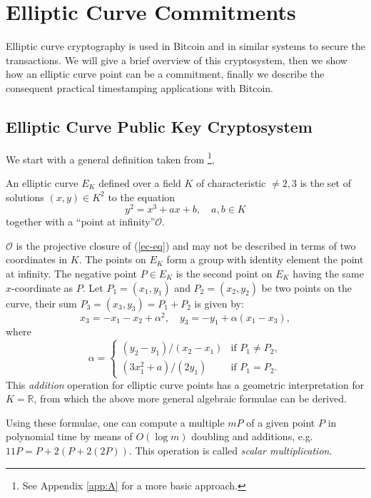 \chapter{Elliptic Curve Commitments}
\label{chpr:ec-commitments}
Elliptic curve cryptography is used in Bitcoin and in similar systems to secure the transactions. 
We will give a brief overview of this cryptosystem, then we show how an elliptic curve point can be a commitment, finally we describe the consequent practical timestamping applications with Bitcoin.  

\section{Elliptic Curve Public Key Cryptosystem}
We start with a general definition taken from \cite{Koblitz1987}\footnote{See Appendix \ref{app:A} for a more basic approach.},
\begin{mydef}
	An elliptic curve $E_K$ defined over a field $K$ of characteristic $\neq 2, 3$ is the set of solutions $(x,y)\in K^2$ to the equation
	\begin{equation}
	\label{ec-eq}
	y^2 = x^3 + ax + b, \quad a,b \in K
	\end{equation}
	together with a \textquotedblleft point at infinity\textquotedblright $\mathcal{O}$.
\end{mydef}
$\mathcal{O}$ is the projective closure of (\ref{ec-eq}) and may not be described in terms of two coordinates in $K$.
The points on $E_K$ form a group with identity element the point at infinity. The negative point $P \in E_K$ is the second point on $E_K$ having the same $x$-coordinate as $P$. Let $P_1=(x_1,y_1)$ and $P_2=(x_2,y_2)$ be two points on the curve, their sum $P_3=(x_3,y_3) = P_1 + P_2$ is given by:
\begin{equation}
x_3 = -x_1 -x_2 + \alpha^2, \quad 
y_3 = -y_1 + \alpha(x_1 - x_3),
\end{equation}
where
\begin{equation}
\alpha = \begin{cases}
			(y_2 - y_1)/(x_2 - x_1) & \textrm{if } P_1 \neq P_2, \\
			(3x_1^2 + a)/(2y_1) & \textrm{if } P_1 = P_2.
\end{cases}
\end{equation}
This \textit{addition} operation for elliptic curve points has a geometric interpretation for $K = \mathbb{R}$, from which the above more general algebraic formulae can be derived.

Using these formulae, one can compute a multiple $mP$ of a given point $P$ in polynomial time by means of $O(\log m)$ doubling and additions, e.g. $11P = P + 2(P + 2(2P))$. This operation is called \textit{scalar multiplication}.

